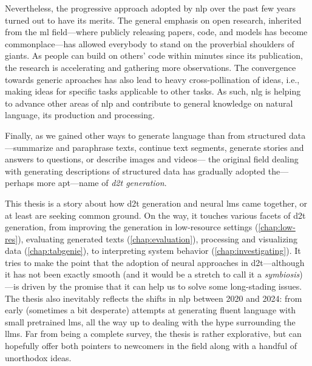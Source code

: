 Nevertheless, the progressive approach adopted by \ac{nlp} over the past few years turned out to have its merits. The general emphasis on open research, inherited from the \ac{ml} field---where publicly releasing papers, code, and models has become commonplace---has allowed everybody to stand on the proverbial shoulders of giants. As people can build on others' code within minutes since its publication, the research is accelerating and gathering more observations. The convergence towards generic aproaches has also lead to heavy cross-pollination of ideas, i.e., making ideas for specific tasks applicable to other tasks. As such, \ac{nlg} is helping to advance other areas of \ac{nlp} and contribute to general knowledge on natural language, its production and processing.

Finally, as we gained other ways to generate language than from structured data---summarize and paraphrase texts, continue text segments, generate stories and answers to questions, or describe images and videos---%
the original field dealing with generating descriptions of structured data has gradually adopted the---perhaps more apt---name of \emph{\ac{d2t} generation}.

This thesis is a story about how \acl{d2t} generation and neural \aclp{lm} came together, or at least are seeking common ground. On the way, it touches various facets of \ac{d2t} generation, from improving the generation in low-resource settings (\autoref{chap:low-res}), evaluating generated texts (\autoref{chap:evaluation}), processing and visualizing data (\autoref{chap:tabgenie}), to interpreting system behavior (\autoref{chap:investigating}). It tries to make the point that the adoption of neural approaches in \ac{d2t}---although it has not been exactly smooth (and it would be a stretch to call it a \emph{symbiosis})---is driven by the promise that it can help us to solve some long-stading issues. The thesis also inevitably reflects the shifts in \ac{nlp} between 2020 and 2024: from early (sometimes a bit desperate) attempts at generating fluent language with small pretrained \acp{lm}, all the way up to dealing with the hype surrounding the \acp{llm}.  Far from being a complete survey, the thesis is rather explorative, but can hopefully offer both pointers to newcomers in the field along with a handful of unorthodox ideas.










